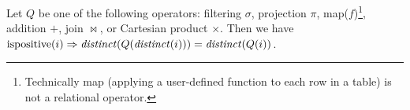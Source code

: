 \begin{comment}
\noindent
\begin{tabular}{m{3.5cm}m{.5cm}m{3.5cm}}
\begin{tikzpicture}[auto,>=latex]
  \node[] (input) {$i$};
  \node[block, right of=input, node distance=1.1cm] (distinct) {$\distinct$};
  \node[block, right of=distinct, node distance=1.2cm] (q) {$Q$};
  \node[right of=q] (output)  {$o$};
  \draw[->] (input) -- (distinct);
  \draw[->] (distinct) -- (q);
  \draw[->] (q) -- (output);
\end{tikzpicture}
&
$\cong$
&
\begin{tikzpicture}[auto,>=latex]
  \node[] (input) {$i$};
  \node[block, right of=input] (q) {$Q$};
  \node[block, right of=q, node distance=1.2cm] (distinct1) {$\distinct$};
  \node[right of=distinct1, node distance=1.2cm] (output)  {$o$};
  \draw[->] (input) -- (q);
  \draw[->] (q) -- (distinct1);
  \draw[->] (distinct1) -- (output);
\end{tikzpicture}
\end{tabular}

This rule allows us to delay the application of $\distinct$.
\end{comment}

\begin{proposition}\label{prop-distinct-once}
Let $Q$ be one of the following \zrs operators: filtering $\sigma$,
projection $\pi$, map($f$)\footnote{Technically map (applying a user-defined
function to each row in a table) is not a relational operator.},
addition $+$, join $\bowtie$, or
Cartesian product $\times$.
Then we have $\mbox{ispositive}(i) \Rightarrow \mathit{distinct}(Q(\mathit{distinct}(i))) = \mathit{distinct}(Q(i))$.
\end{proposition}

\begin{comment}
\noindent
\begin{tabular}{m{6.5cm}m{.5cm}}
\begin{tikzpicture}[auto,>=latex]
  \node[] (input) {$i$};
  \node[block, right of=input, node distance=1.5cm] (distinct) {$\distinct$};
  \node[block, right of=distinct, node distance=1.5cm] (q) {$Q$};
  \node[block, right of=q, node distance=1.5cm] (distinct1) {$\distinct$};
  \node[right of=distinct1, node distance=1.5cm] (output)  {$o$};
  \draw[->] (input) -- (distinct);
  \draw[->] (distinct) -- (q);
  \draw[->] (q) -- (distinct1);
  \draw[->] (distinct1) -- (output);
\end{tikzpicture}
&
$\cong$ \\
\begin{tikzpicture}[auto,>=latex]
  \node[] (input) {$i$};
  \node[block, right of=input] (q) {$Q$};
  \node[block, right of=q, node distance=1.5cm] (distinct1) {$\distinct$};
  \node[right of=distinct1, node distance=1.5cm] (output)  {$o$};
  \draw[->] (input) -- (q);
  \draw[->] (q) -- (distinct1);
  \draw[->] (distinct1) -- (output);
\end{tikzpicture}
\end{tabular}
\end{comment}

